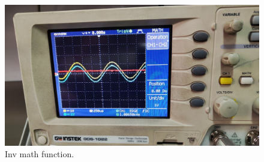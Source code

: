 \documentclass[11pt]{article}
\newcommand{\PicScale}{0.2}
\begin{document}
\begin{question}
{        \begin{figure}[H]
            \begin{center}
                \includegraphics[scale=\PicScale]{Fig/20.jpeg}
                \caption{Inv math function.}
            \end{center}
        \end{figure}

    }

\end{question}

\end{document}
